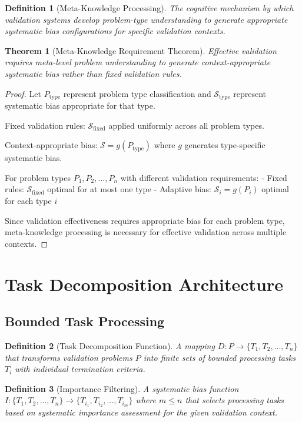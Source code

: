 \documentclass[12pt,a4paper]{article}
\newtheorem{theorem}{Theorem}
\newtheorem{definition}{Definition}
\begin{document}
\begin{definition}[Meta-Knowledge Processing]
The cognitive mechanism by which validation systems develop problem-type understanding to generate appropriate systematic bias configurations for specific validation contexts.
\end{definition}

\begin{theorem}[Meta-Knowledge Requirement Theorem]
Effective validation requires meta-level problem understanding to generate context-appropriate systematic bias rather than fixed validation rules.
\end{theorem}

\begin{proof}
Let $P_{\text{type}}$ represent problem type classification and $\mathcal{S}_{\text{type}}$ represent systematic bias appropriate for that type.

Fixed validation rules: $\mathcal{S}_{\text{fixed}}$ applied uniformly across all problem types.

Context-appropriate bias: $\mathcal{S} = g(P_{\text{type}})$ where $g$ generates type-specific systematic bias.

For problem types $P_1, P_2, ..., P_n$ with different validation requirements:
- Fixed rules: $\mathcal{S}_{\text{fixed}}$ optimal for at most one type
- Adaptive bias: $\mathcal{S}_i = g(P_i)$ optimal for each type $i$

Since validation effectiveness requires appropriate bias for each problem type, meta-knowledge processing is necessary for effective validation across multiple contexts.
\end{proof}

\section{Task Decomposition Architecture}

\subsection{Bounded Task Processing}

\begin{definition}[Task Decomposition Function]
A mapping $D: P \to \{T_1, T_2, ..., T_n\}$ that transforms validation problems $P$ into finite sets of bounded processing tasks $T_i$ with individual termination criteria.
\end{definition}

\begin{definition}[Importance Filtering]
A systematic bias function $I: \{T_1, T_2, ..., T_n\} \to \{T_{i_1}, T_{i_2}, ..., T_{i_m}\}$ where $m \leq n$ that selects processing tasks based on systematic importance assessment for the given validation context.
\end{definition}
\end{document}
